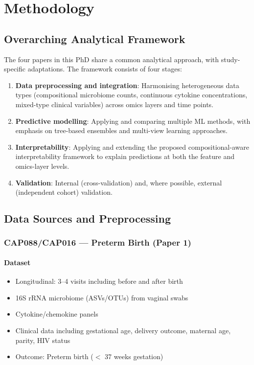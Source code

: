 \documentclass[12pt,a4paper]{report}
\begin{document}
\chapter{Methodology}

\section{Overarching Analytical Framework}

The four papers in this PhD share a common analytical approach, with study-specific adaptations. The framework consists of four stages:

\begin{enumerate}
    \item \textbf{Data preprocessing and integration}: Harmonising heterogeneous data types (compositional microbiome counts, continuous cytokine concentrations, mixed-type clinical variables) across omics layers and time points.
    \item \textbf{Predictive modelling}: Applying and comparing multiple ML methods, with emphasis on tree-based ensembles and multi-view learning approaches.
    \item \textbf{Interpretability}: Applying and extending the proposed compositional-aware interpretability framework to explain predictions at both the feature and omics-layer levels.
    \item \textbf{Validation}: Internal (cross-validation) and, where possible, external (independent cohort) validation.
\end{enumerate}

\section{Data Sources and Preprocessing}

\subsection{CAP088/CAP016 --- Preterm Birth (Paper 1)}

\subsubsection{Dataset}
\begin{itemize}
    \item Longitudinal: 3--4 visits including before and after birth
    \item 16S rRNA microbiome (ASVs/OTUs) from vaginal swabs
    \item Cytokine/chemokine panels
    \item Clinical data including gestational age, delivery outcome, maternal age, parity, HIV status
    \item Outcome: Preterm birth ($<$ 37 weeks gestation)
\end{itemize}
\end{document}
